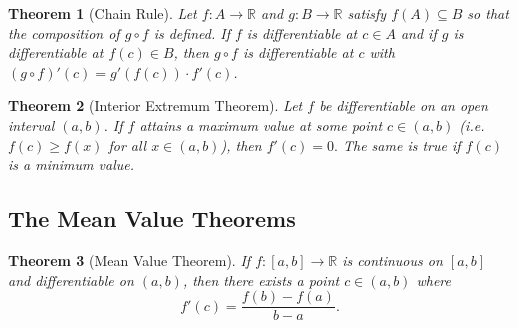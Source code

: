 \documentclass[10pt]{article}
\newtheorem{theorem}{Theorem}[section]
\begin{document}
\begin{theorem}[Chain Rule]
    Let $f:A\to\mathbb{R}$ and $g:B\to\mathbb{R}$ satisfy $f(A)\subseteq B$ so that the composition of $g\circ f$ is defined. If $f$ is differentiable at $c\in A$ and if $g$ is differentiable at $f(c)\in B$, then $g\circ f$ is differentiable at $c$ with $(g\circ f)'(c)=g'(f(c))\cdot f'(c)$.
\end{theorem}

\begin{theorem}[Interior Extremum Theorem]
    Let $f$ be differentiable on an open interval $(a,b)$. If $f$ attains a maximum value at some point $c\in(a,b)$ (i.e. $f(c)\ge f(x)$ for all $x\in(a,b)$), then $f'(c)=0.$ The same is true if $f(c)$ is a minimum value.
\end{theorem}

\subsection{The Mean Value Theorems}

\begin{theorem}[Mean Value Theorem]
    If $f:[a,b]\to\mathbb{R}$ is continuous on $[a,b]$ and differentiable on $(a,b)$, then there exists a point $c\in(a,b)$ where
    \[f'(c)=\frac{f(b)-f(a)}{b-a}.\]
\end{theorem}
\end{document}
